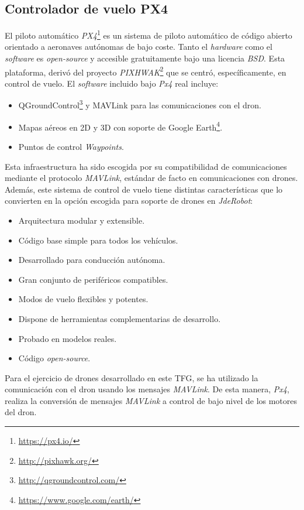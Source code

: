 \subsection{Controlador de vuelo PX4}
El piloto automático \textit{PX4}\footnote{\url{https://px4.io/}} es un sistema de piloto automático de código abierto orientado a aeronaves autónomas de bajo coste. Tanto el \textit{hardware} como el \textit{software} es \textit{open-source} y accesible gratuitamente bajo una licencia \textit{BSD}. Esta plataforma, derivó del proyecto \textit{PIXHWAK}\footnote{\url{http://pixhawk.org/}} que se centró, específicamente, en control de vuelo. El \textit{software} incluido bajo \textit{Px4} real incluye:
\begin{itemize}
    \item QGroundControl\footnote{\url{http://qgroundcontrol.com/}} y MAVLink para las comunicaciones con el dron.
    \item Mapas aéreos en 2D y 3D con soporte de Google Earth\footnote{\url{https://www.google.com/earth/}}.
    \item Puntos de control \textit{Waypoints}.
\end{itemize}

Esta infraestructura ha sido escogida por su compatibilidad de comunicaciones mediante el protocolo \textit{MAVLink}, estándar de facto en comunicaciones con drones. Además, este sistema de control de vuelo tiene distintas características que lo convierten en la opción escogida para soporte de drones en \textit{JdeRobot}:
\begin{itemize}
    \item Arquitectura modular y extensible.
    \item Código base simple para todos los vehículos.
    \item Desarrollado para conducción autónoma.
    \item Gran conjunto de periféricos compatibles.
    \item Modos de vuelo flexibles y potentes.
    \item Dispone de herramientas complementarias de desarrollo.
    \item Probado en modelos reales.
    \item Código \textit{open-source}.
\end{itemize}

Para el ejercicio de drones desarrollado en este TFG, se ha utilizado la comunicación con el dron usando los mensajes \textit{MAVLink}. De esta manera, \textit{Px4}, realiza la conversión de mensajes \textit{MAVLink} a control de bajo nivel de los motores del dron.

